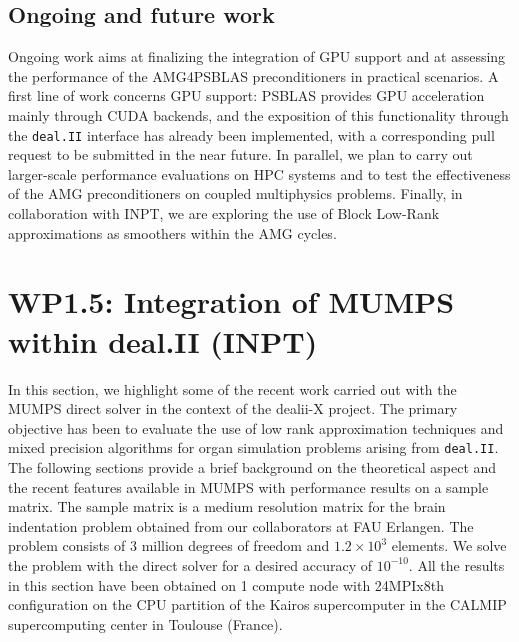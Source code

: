 \documentclass[a4paper,12pt]{article}
\begin{document}
\subsection{Ongoing and future work}

Ongoing work aims at finalizing the integration of GPU support and at assessing the performance of the AMG4PSBLAS preconditioners in practical
scenarios. A first line of work concerns GPU support: PSBLAS provides GPU acceleration mainly through CUDA backends, and the exposition
of this functionality through the \texttt{deal.II} interface has already been implemented, with a
corresponding pull request to be submitted in the near future. In parallel, we plan to carry out larger-scale performance
evaluations on HPC systems and to test the effectiveness of the AMG preconditioners on coupled multiphysics problems. Finally, in collaboration with
INPT, we are exploring the use of Block Low-Rank approximations as smoothers within the AMG cycles.



\newpage



\section{WP1.5: Integration of MUMPS within deal.II (INPT)}
\label{sec:inpt}

In this section, we highlight some of the recent work carried out with
the MUMPS direct solver in the context of the dealii-X project. The
primary objective has been to evaluate the use of low rank
approximation techniques and mixed precision algorithms for organ
simulation problems arising from \texttt{deal.II}. The following
sections provide a brief background on the theoretical aspect and the
recent features available in MUMPS with performance results on a
sample matrix. The sample matrix is a medium resolution matrix for the
brain indentation problem obtained from our collaborators at FAU
Erlangen. The problem consists of 3 million degrees of freedom and
$1.2\times 10^3$ elements. We solve the problem with the direct solver
for a desired accuracy of $10^{-10}$. All the results in this section
have been obtained on 1 compute node with 24MPIx8th configuration on
the CPU partition of the Kairos supercomputer in the CALMIP supercomputing
center in Toulouse (France).
\end{document}
